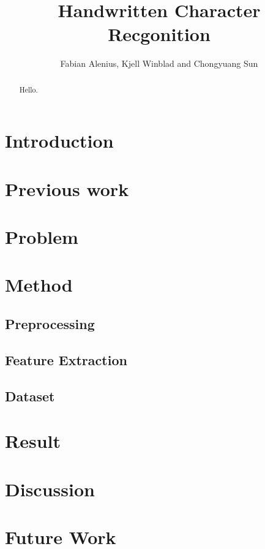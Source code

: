 \documentclass[11pt]{article}
\author{Fabian Alenius, Kjell Winblad and Chongyuang Sun} \title{Handwritten Character Recgonition}
\begin{document}
\maketitle

\begin{abstract}
Hello.

\end{abstract}

\section{Introduction}
\cite{trec}
\section{Previous work}

\section{Problem}

\section{Method}

\subsection{Preprocessing}

\subsection{Feature Extraction}

\subsection{Dataset}\label{sec:dataset}


\section{Result}\label{sec:result}


\section{Discussion}

\section{Future Work}


\end{document}
